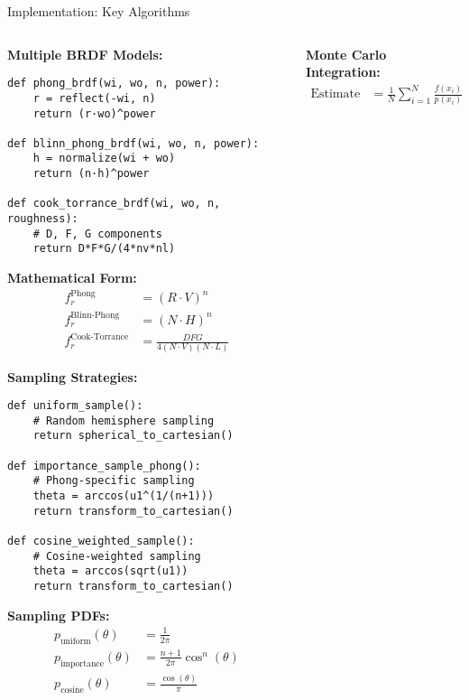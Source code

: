 \documentclass[aspectratio=169]{beamer}
\begin{document}
\begin{frame}{Implementation: Key Algorithms}
    \begin{columns}
        \begin{column}{0.5\textwidth}
            \textbf{Multiple BRDF Models:}
            \begin{verbatim}
def phong_brdf(wi, wo, n, power):
    r = reflect(-wi, n)
    return (r·wo)^power

def blinn_phong_brdf(wi, wo, n, power):
    h = normalize(wi + wo)
    return (n·h)^power

def cook_torrance_brdf(wi, wo, n, roughness):
    # D, F, G components
    return D*F*G/(4*nv*nl)
            \end{verbatim}
            
            \textbf{Mathematical Form:}
            \begin{align}
                f_r^{\text{Phong}} &= (R \cdot V)^n \\
                f_r^{\text{Blinn-Phong}} &= (N \cdot H)^n \\
                f_r^{\text{Cook-Torrance}} &= \frac{DFG}{4(N \cdot V)(N \cdot L)}
            \end{align}
            
            \textbf{Sampling Strategies:}
            \begin{verbatim}
def uniform_sample():
    # Random hemisphere sampling
    return spherical_to_cartesian()

def importance_sample_phong():
    # Phong-specific sampling
    theta = arccos(u1^(1/(n+1)))
    return transform_to_cartesian()

def cosine_weighted_sample():
    # Cosine-weighted sampling
    theta = arccos(sqrt(u1))
    return transform_to_cartesian()
            \end{verbatim}
            
            \textbf{Sampling PDFs:}
            \begin{align}
                p_{\text{uniform}}(\theta) &= \frac{1}{2\pi} \\
                p_{\text{importance}}(\theta) &= \frac{n+1}{2\pi} \cos^n(\theta) \\
                p_{\text{cosine}}(\theta) &= \frac{\cos(\theta)}{\pi}
            \end{align}
        \end{column}
        \begin{column}{0.5\textwidth}
            \textbf{Monte Carlo Integration:}
            \begin{align}
                \text{Estimate} &= \frac{1}{N} \sum_{i=1}^{N} \frac{f(x_i)}{p(x_i)}
            \end{align}
            

\end{column}
\end{columns}
\end{frame}
\end{document}
